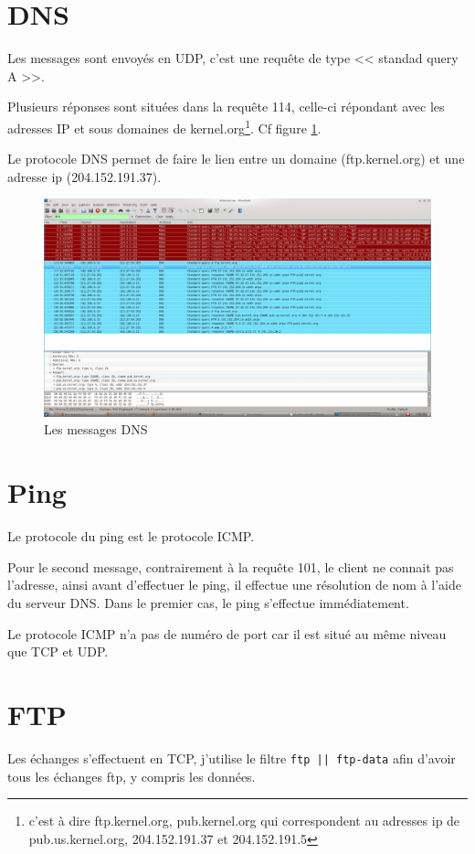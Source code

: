 \documentclass[12pt,a4paper,openany]{article}
\begin{document}
	\section{DNS}
	Les messages sont envoyés en UDP, c'est une requête de type << standad query A >>.

	Plusieurs réponses sont situées dans la requête 114, celle-ci répondant avec les adresses IP et sous domaines de kernel.org\footnote{c'est à dire
	ftp.kernel.org, pub.kernel.org qui correspondent au adresses ip de pub.us.kernel.org, 204.152.191.37 et 204.152.191.5}. Cf figure \ref{fig:kernel}.

	Le protocole DNS permet de faire le lien entre un domaine (ftp.kernel.org) et une adresse ip (204.152.191.37).

	\begin{figure}[H]
		\centering
		\includegraphics[width=13cm]{Capture5.jpeg}
		\caption{Les messages DNS}
		\label{fig:kernel}
	\end{figure}

	\section{Ping}
	Le protocole du ping est le protocole ICMP.

	Pour le second message, contrairement à la requête 101, le client ne connait pas l'adresse, ainsi avant d'effectuer le ping, il effectue une
	résolution de nom à l'aide du serveur DNS. Dans le premier cas, le ping s'effectue immédiatement.
	
	Le protocole ICMP n'a pas de numéro de port car il est situé au même niveau que TCP et UDP.

	\section{FTP}
	Les échanges s'effectuent en TCP, j'utilise le filtre \texttt{ftp || ftp-data} afin d'avoir tous les échanges ftp, y compris les données.
\end{document}
